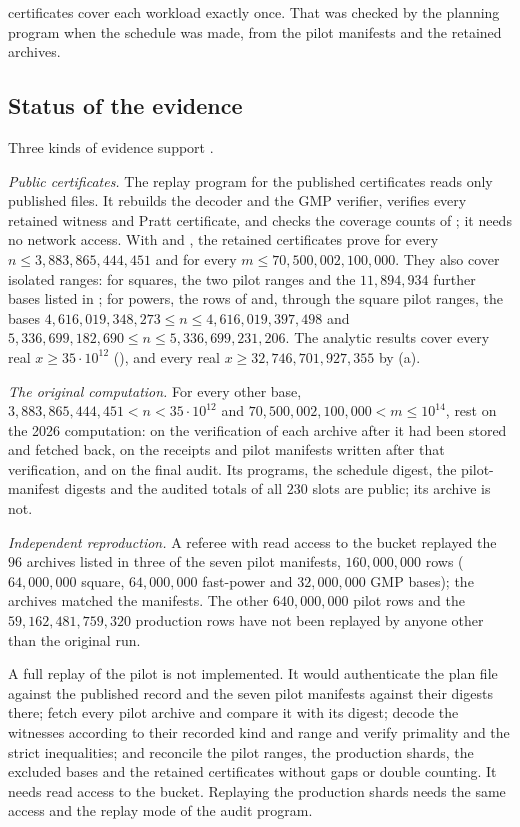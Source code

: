 \documentclass[11pt,colorlinks]{charlie}
\begin{document}
certificates cover each workload exactly once. That was checked by the planning program when the schedule was made, from the pilot manifests and the retained archives.

\subsection{Status of the evidence}\label{sec:status}
Three kinds of evidence support .

\emph{Public certificates.} The replay program for the published certificates reads only published files. It rebuilds the decoder and the GMP verifier, verifies every retained witness and Pratt certificate, and checks the coverage counts of ; it needs no network access. With \cite{SW} and , the retained certificates prove  for every $n\le3{,}883{,}865{,}444{,}451$ and  for every $m\le70{,}500{,}002{,}100{,}000$. They also cover isolated ranges: for squares, the two pilot ranges and the $11{,}894{,}934$ further bases listed in ; for powers, the rows of  and, through the square pilot ranges, the bases $4{,}616{,}019{,}348{,}273\le n\le4{,}616{,}019{,}397{,}498$ and $5{,}336{,}699{,}182{,}690\le n\le5{,}336{,}699{,}231{,}206$. The analytic results cover every real $x\ge35\cdot10^{12}$ (), and every real $x\ge32{,}746{,}701{,}927{,}355$ by (a).

\emph{The original computation.} For every other base, $3{,}883{,}865{,}444{,}451<n<35\cdot10^{12}$ and $70{,}500{,}002{,}100{,}000<m\le10^{14}$,  rest on the 2026 computation: on the verification of each archive after it had been stored and fetched back, on the receipts and pilot manifests written after that verification, and on the final audit. Its programs, the schedule digest, the pilot-manifest digests and the audited totals of all $230$ slots are public; its archive is not.

\emph{Independent reproduction.} A referee with read access to the bucket replayed the $96$ archives listed in three of the seven pilot manifests, $160{,}000{,}000$ rows ($64{,}000{,}000$ square, $64{,}000{,}000$ fast-power and $32{,}000{,}000$ GMP bases); the archives matched the manifests. The other $640{,}000{,}000$ pilot rows and the $59{,}162{,}481{,}759{,}320$ production rows have not been replayed by anyone other than the original run.

A full replay of the pilot is not implemented. It would authenticate the plan file against the published record and the seven pilot manifests against their digests there; fetch every pilot archive and compare it with its digest; decode the witnesses according to their recorded kind and range and verify primality and the strict inequalities; and reconcile the pilot ranges, the production shards, the excluded bases and the retained certificates without gaps or double counting. It needs read access to the bucket. Replaying the production shards needs the same access and the replay mode of the audit program.
\end{document}
